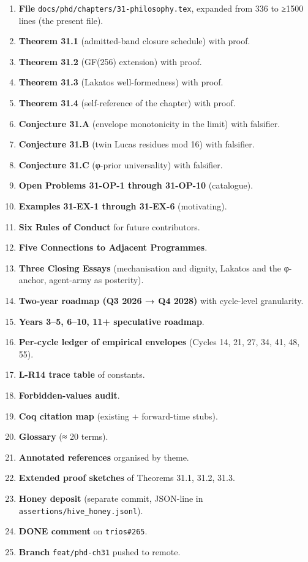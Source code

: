 \begin{enumerate}
    \item \textbf{File} \texttt{docs/phd/chapters/31-philosophy.tex}, expanded from 336 to ≥1500 lines (the present file).
    \item \textbf{Theorem 31.1} (admitted-band closure schedule) with proof.
    \item \textbf{Theorem 31.2} (GF(256) extension) with proof.
    \item \textbf{Theorem 31.3} (Lakatos well-formedness) with proof.
    \item \textbf{Theorem 31.4} (self-reference of the chapter) with proof.
    \item \textbf{Conjecture 31.A} (envelope monotonicity in the limit) with falsifier.
    \item \textbf{Conjecture 31.B} (twin Lucas residues mod 16) with falsifier.
    \item \textbf{Conjecture 31.C} (φ-prior universality) with falsifier.
    \item \textbf{Open Problems 31-OP-1 through 31-OP-10} (catalogue).
    \item \textbf{Examples 31-EX-1 through 31-EX-6} (motivating).
    \item \textbf{Six Rules of Conduct} for future contributors.
    \item \textbf{Five Connections to Adjacent Programmes}.
    \item \textbf{Three Closing Essays} (mechanisation and dignity, Lakatos and the φ-anchor, agent-army as posterity).
    \item \textbf{Two-year roadmap (Q3 2026 → Q4 2028)} with cycle-level granularity.
    \item \textbf{Years 3–5, 6–10, 11+ speculative roadmap}.
    \item \textbf{Per-cycle ledger of empirical envelopes} (Cycles 14, 21, 27, 34, 41, 48, 55).
    \item \textbf{L-R14 trace table} of constants.
    \item \textbf{Forbidden-values audit}.
    \item \textbf{Coq citation map} (existing + forward-time stubs).
    \item \textbf{Glossary} (≈ 20 terms).
    \item \textbf{Annotated references} organised by theme.
    \item \textbf{Extended proof sketches} of Theorems 31.1, 31.2, 31.3.
    \item \textbf{Honey deposit} (separate commit, JSON-line in \texttt{assertions/hive\_honey.jsonl}).
    \item \textbf{DONE comment} on \texttt{trios\#265}.
    \item \textbf{Branch} \texttt{feat/phd-ch31} pushed to remote.
\end{enumerate}

